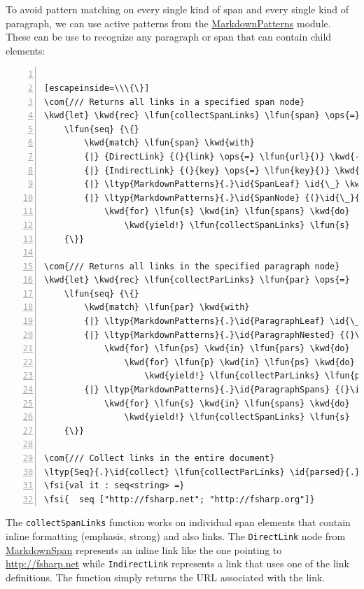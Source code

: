 \documentclass{article}
\newcommand{\id}[1]{\textcolor{black}{#1}}
\newcommand{\com}[1]{\textcolor{officegreen}{#1}}
\newcommand{\kwd}[1]{\textcolor{navy}{#1}}
\newcommand{\ops}[1]{\textcolor{purple}{#1}}
\newcommand{\fsi}[1]{\textcolor{outputcolor}{#1}}
\begin{document}
To avoid pattern matching on every single kind of span and every single kind of
paragraph, we can use active patterns from the \href{https://fsprojects.github.io/FSharp.Formatting/reference/fsharp-formatting-markdown-markdownpatterns.html}{MarkdownPatterns} module. These can be use
to recognize any paragraph or span that can contain child elements:
\begin{lstlisting}[numbers=left]

[escapeinside=\\\{\}]
\com{/// Returns all links in a specified span node}
\kwd{let} \kwd{rec} \lfun{collectSpanLinks} \lfun{span} \ops{=}
    \lfun{seq} {\{}
        \kwd{match} \lfun{span} \kwd{with}
        {|} {DirectLink} {(}{link} \ops{=} \lfun{url}{)} \kwd{->} \kwd{yield} \lfun{url}
        {|} {IndirectLink} {(}{key} \ops{=} \lfun{key}{)} \kwd{->} \kwd{yield} \lfun{fst} {(}\id{parsed}{.}\id{DefinedLinks}{.}{[}\lfun{key}{]}{)}
        {|} \ltyp{MarkdownPatterns}{.}\id{SpanLeaf} \id{\_} \kwd{->} {(}{)}
        {|} \ltyp{MarkdownPatterns}{.}\id{SpanNode} {(}\id{\_}{,} \lfun{spans}{)} \kwd{->}
            \kwd{for} \lfun{s} \kwd{in} \lfun{spans} \kwd{do}
                \kwd{yield!} \lfun{collectSpanLinks} \lfun{s}
    {\}}

\com{/// Returns all links in the specified paragraph node}
\kwd{let} \kwd{rec} \lfun{collectParLinks} \lfun{par} \ops{=}
    \lfun{seq} {\{}
        \kwd{match} \lfun{par} \kwd{with}
        {|} \ltyp{MarkdownPatterns}{.}\id{ParagraphLeaf} \id{\_} \kwd{->} {(}{)}
        {|} \ltyp{MarkdownPatterns}{.}\id{ParagraphNested} {(}\id{\_}{,} \lfun{pars}{)} \kwd{->}
            \kwd{for} \lfun{ps} \kwd{in} \lfun{pars} \kwd{do}
                \kwd{for} \lfun{p} \kwd{in} \lfun{ps} \kwd{do}
                    \kwd{yield!} \lfun{collectParLinks} \lfun{p}
        {|} \ltyp{MarkdownPatterns}{.}\id{ParagraphSpans} {(}\id{\_}{,} \lfun{spans}{)} \kwd{->}
            \kwd{for} \lfun{s} \kwd{in} \lfun{spans} \kwd{do}
                \kwd{yield!} \lfun{collectSpanLinks} \lfun{s}
    {\}}

\com{/// Collect links in the entire document}
\ltyp{Seq}{.}\id{collect} \lfun{collectParLinks} \id{parsed}{.}\id{Paragraphs}
\fsi{val it : seq<string> =}
\fsi{  seq ["http://fsharp.net"; "http://fsharp.org"]}

\end{lstlisting}



The \texttt{collectSpanLinks} function works on individual span elements that contain inline
formatting (emphasis, strong) and also links. The \texttt{DirectLink} node from \href{https://fsprojects.github.io/FSharp.Formatting/reference/fsharp-formatting-markdown-markdownspan.html}{MarkdownSpan} represents an inline
link like the one pointing to \href{http://fsharp.net}{http://fsharp.net} while \texttt{IndirectLink} represents a
link that uses one of the link definitions. The function simply returns the URL associated
with the link.
\end{document}
